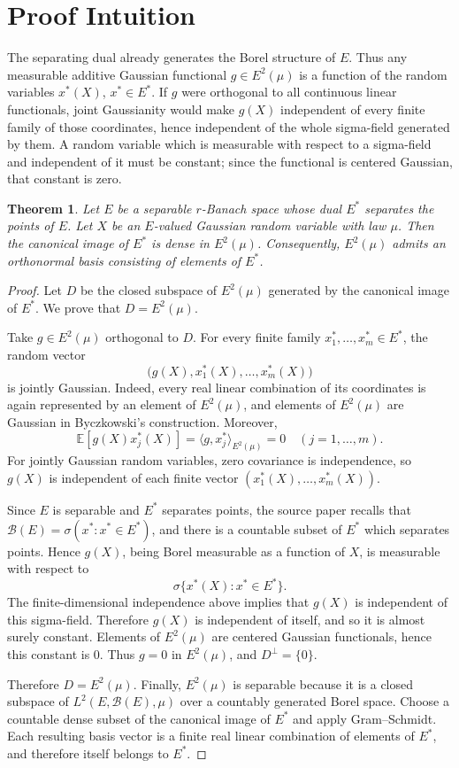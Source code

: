 \documentclass[11pt]{article}
\newtheorem{theorem}{Theorem}
\newcommand{\EE}{\mathbb E}
\newcommand{\cB}{\mathcal B}
\begin{document}
\section*{Proof Intuition}

The separating dual already generates the Borel structure of \(E\). Thus any
measurable additive Gaussian functional \(g\in E^2(\mu)\) is a function of the
random variables \(x^*(X)\), \(x^*\in E^*\). If \(g\) were orthogonal to all
continuous linear functionals, joint Gaussianity would make \(g(X)\)
independent of every finite family of those coordinates, hence independent of
the whole sigma-field generated by them. A random variable which is measurable
with respect to a sigma-field and independent of it must be constant; since
the functional is centered Gaussian, that constant is zero.

\begin{theorem}
Let \(E\) be a separable \(r\)-Banach space whose dual \(E^*\) separates the
points of \(E\). Let \(X\) be an \(E\)-valued Gaussian random variable with law
\(\mu\). Then the canonical image of \(E^*\) is dense in \(E^2(\mu)\).
Consequently, \(E^2(\mu)\) admits an orthonormal basis consisting of elements
of \(E^*\).
\end{theorem}

\begin{proof}
Let \(D\) be the closed subspace of \(E^2(\mu)\) generated by the canonical
image of \(E^*\). We prove that \(D=E^2(\mu)\).

Take \(g\in E^2(\mu)\) orthogonal to \(D\). For every finite family
\(x_1^*,\ldots,x_m^*\in E^*\), the random vector
\[
  \bigl(g(X),x_1^*(X),\ldots,x_m^*(X)\bigr)
\]
is jointly Gaussian. Indeed, every real linear combination of its coordinates
is again represented by an element of \(E^2(\mu)\), and elements of
\(E^2(\mu)\) are Gaussian in Byczkowski's construction. Moreover,
\[
  \EE[g(X)x_j^*(X)]=\langle g,x_j^*\rangle_{E^2(\mu)}=0
  \quad (j=1,\ldots,m).
\]
For jointly Gaussian random variables, zero covariance is independence, so
\(g(X)\) is independent of each finite vector
\((x_1^*(X),\ldots,x_m^*(X))\).

Since \(E\) is separable and \(E^*\) separates points, the source paper recalls
that \(\cB(E)=\sigma(x^*:x^*\in E^*)\), and there is a countable subset of
\(E^*\) which separates points. Hence \(g(X)\), being Borel measurable as a
function of \(X\), is measurable with respect to
\[
  \sigma\{x^*(X):x^*\in E^*\}.
\]
The finite-dimensional independence above implies that \(g(X)\) is independent
of this sigma-field. Therefore \(g(X)\) is independent of itself, and so it is
almost surely constant. Elements of \(E^2(\mu)\) are centered Gaussian
functionals, hence this constant is \(0\). Thus \(g=0\) in \(E^2(\mu)\), and
\(D^\perp=\{0\}\).

Therefore \(D=E^2(\mu)\). Finally, \(E^2(\mu)\) is separable because it is a
closed subspace of \(L^2(E,\cB(E),\mu)\) over a countably generated Borel
space. Choose a countable dense subset of the canonical image of \(E^*\) and
apply Gram--Schmidt. Each resulting basis vector is a finite real linear
combination of elements of \(E^*\), and therefore itself belongs to \(E^*\).
\end{proof}
\end{document}
